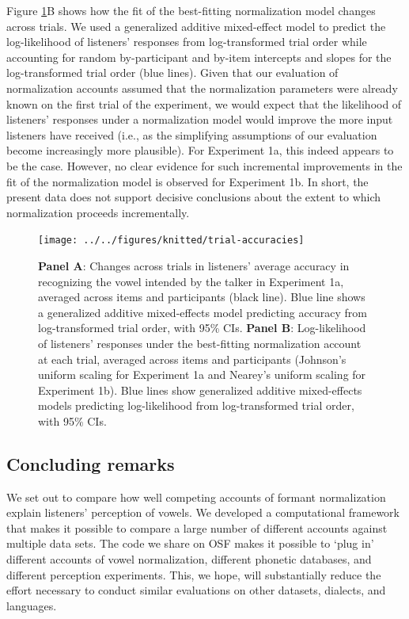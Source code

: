 \documentclass[preprint]{JASA}
\begin{document}
Figure \ref{fig:trial-accuracies}B shows how the fit of the best-fitting normalization model changes across trials. We used a generalized additive mixed-effect model to predict the log-likelihood of listeners' responses from log-transformed trial order while accounting for random by-participant and by-item intercepts and slopes for the log-transformed trial order (blue lines). Given that our evaluation of normalization accounts assumed that the normalization parameters were already known on the first trial of the experiment, we would expect that the likelihood of listeners' responses under a normalization model would improve the more input listeners have received (i.e., as the simplifying assumptions of our evaluation become increasingly more plausible). For Experiment 1a, this indeed appears to be the case. However, no clear evidence for such incremental improvements in the fit of the normalization model is observed for Experiment 1b. In short, the present data does not support decisive conclusions about the extent to which normalization proceeds incrementally.



\begin{figure}[!ht]

{\centering \texttt{[image: ../../figures/knitted/trial-accuracies]} 

}

\caption{\textbf{Panel A}: Changes across trials in listeners' average accuracy in recognizing the vowel intended by the talker in Experiment 1a, averaged across items and participants (black line). Blue line shows a generalized additive mixed-effects model predicting accuracy from log-transformed trial order, with 95\% CIs. \textbf{Panel B}: Log-likelihood of listeners' responses under the best-fitting normalization account at each trial, averaged across items and participants (Johnson's uniform scaling for Experiment 1a and Nearey's uniform scaling for Experiment 1b). Blue lines show generalized additive mixed-effects models predicting log-likelihood from log-transformed trial order, with 95\% CIs.}\label{fig:trial-accuracies}
\end{figure}

\subsection{Concluding remarks}\label{concluding-remarks}

We set out to compare how well competing accounts of formant normalization explain listeners' perception of vowels. We developed a computational framework that makes it possible to compare a large number of different accounts against multiple data sets. The code we share on OSF makes it possible to `plug in' different accounts of vowel normalization, different phonetic databases, and different perception experiments. This, we hope, will substantially reduce the effort necessary to conduct similar evaluations on other datasets, dialects, and languages.
\end{document}
